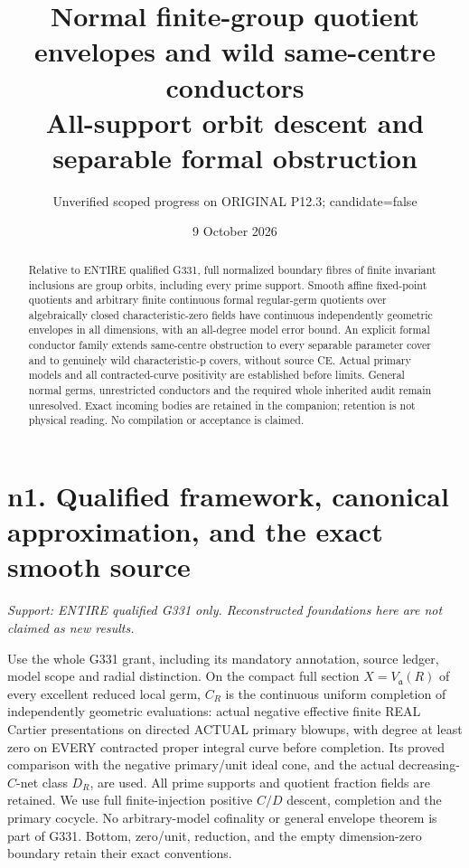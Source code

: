 \documentclass[11pt]{article}
\title{Normal finite-group quotient envelopes and wild same-centre conductors\\
All-support orbit descent and separable formal obstruction}
\author{Unverified scoped progress on ORIGINAL P12.3; candidate=false}
\date{9 October 2026}
\begin{document}
\maketitle
\begin{abstract}
Relative to ENTIRE qualified G331, full normalized boundary fibres of finite
invariant inclusions are group orbits, including every prime support.
Smooth affine fixed-point quotients and arbitrary finite continuous formal
regular-germ quotients over algebraically closed characteristic-zero fields
have continuous independently geometric envelopes in all dimensions, with
an all-degree model error bound. An explicit formal conductor family extends
same-centre obstruction to every separable parameter cover and to genuinely
wild characteristic-p covers, without source CE. Actual primary models and
all contracted-curve positivity are established before limits. General
normal germs, unrestricted conductors and the required whole inherited audit
remain unresolved. Exact incoming bodies are retained in the companion;
retention is not physical reading. No compilation or acceptance is claimed.
\end{abstract}
\tableofcontents
\section{n1. Qualified framework, canonical approximation, and the exact smooth source}
\textit{Support: ENTIRE qualified G331 only. Reconstructed foundations here are not claimed as new results.}

Use the whole G331 grant, including its mandatory annotation, source ledger,
model scope and radial distinction. On the compact full section
$X=V_{\mathfrak a}(R)$ of every excellent reduced local germ, $C_R$ is the
continuous uniform completion of independently geometric evaluations:
actual negative effective finite REAL Cartier presentations on directed
ACTUAL primary blowups, with degree at least zero on EVERY contracted
proper integral curve before completion. Its proved comparison with the
negative primary/unit ideal cone, and the actual decreasing-$C$-net class
$D_R$, are used. All prime supports and quotient fraction fields are retained.
We use full finite-injection positive $C/D$ descent, completion and the
primary cocycle. No arbitrary-model cofinality or general envelope theorem
is part of G331. Bottom, zero/unit, reduction, and the empty dimension-zero
boundary retain their exact conventions.
\end{document}
